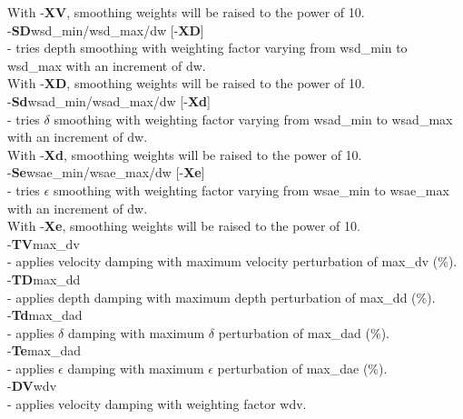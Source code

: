 \documentclass[twoside,final,onecolumn]{article}
\newcommand{\forceindent}{\leavevmode{\parindent=1em\indent}}
\begin{document}
\forceindent\forceindent\forceindent With -\textbf{XV}, smoothing weights will be raised to the power of 10.\\[6pt]
\forceindent\forceindent -\textbf{SD}wsd\_min/wsd\_max/dw [-\textbf{XD}] \\
\forceindent\forceindent\forceindent - tries depth smoothing with weighting factor varying from wsd\_min to wsd\_max with an increment of dw.\\
\forceindent\forceindent\forceindent With -\textbf{XD}, smoothing weights will be raised to the power of 10.\\[6pt]
\forceindent\forceindent -\textbf{Sd}wsad\_min/wsad\_max/dw [-\textbf{Xd}] \\
\forceindent\forceindent\forceindent - tries $\delta$ smoothing with weighting factor varying from wsad\_min to wsad\_max with an increment of dw.\\
\forceindent\forceindent\forceindent With -\textbf{Xd}, smoothing weights will be raised to the power of 10.\\[6pt]
\forceindent\forceindent -\textbf{Se}wsae\_min/wsae\_max/dw [-\textbf{Xe}] \\
\forceindent\forceindent\forceindent - tries $\epsilon$ smoothing with weighting factor varying from wsae\_min to wsae\_max with an increment of dw.\\
\forceindent\forceindent\forceindent With -\textbf{Xe}, smoothing weights will be raised to the power of 10.\\[6pt]
\forceindent -\textbf{TV}max\_dv \\
\forceindent\forceindent - applies velocity damping with maximum velocity perturbation of max\_dv (\%).\\[6pt]
\forceindent -\textbf{TD}max\_dd \\
\forceindent\forceindent - applies depth damping with maximum depth perturbation of max\_dd (\%).\\[6pt]
\forceindent -\textbf{Td}max\_dad \\
\forceindent\forceindent - applies $\delta$ damping with maximum $\delta$ perturbation of max\_dad (\%).\\[6pt]
\forceindent -\textbf{Te}max\_dad \\
\forceindent\forceindent - applies $\epsilon$ damping with maximum $\epsilon$ perturbation of max\_dae (\%).\\[6pt]
\forceindent -\textbf{DV}wdv \\
\forceindent\forceindent - applies velocity damping with weighting factor wdv.\\[6pt]
\end{document}
